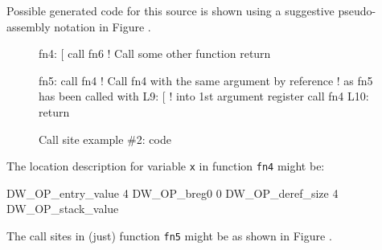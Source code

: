 \clearpage
Possible generated code for this source is shown using a suggestive 
pseudo-\linebreak[0]assembly notation in Figure .
\par %
\begin{figure}[ht]
\begin{nlnlisting}

fn4:
    [%
    call fn6          ! Call some other function
    return

fn5:
    call fn4          ! Call fn4 with the same argument by reference 
                      !   as fn5 has been called with
L9:
    [%
                      !   into 1st argument register
    call fn4
L10:
    return
    
\end{nlnlisting}
\caption{Call site example \#2: code}
\label{fig:callsiteexample2code}
\end{figure}

The location description for variable \texttt{x} in function 
\texttt{fn4} might be:
\par %
\begin{nlnlisting}
    DW_OP_entry_value 4 DW_OP_breg0 0 DW_OP_deref_size 4 DW_OP_stack_value
\end{nlnlisting}

The call sites in (just) function \texttt{fn5} might be as shown in 
Figure .

